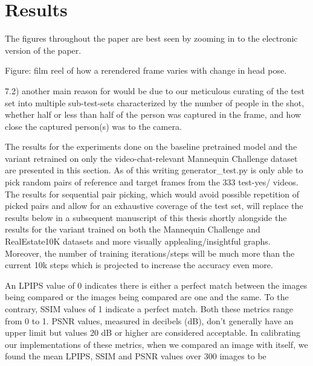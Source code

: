 \section{Results}\label{sec:results} 

The figures throughout the paper are
best seen by zooming in to the electronic version of the paper.

Figure: film reel of how a rerendered frame varies with change in head pose.

7.2) another main reason for would be due to our meticulous curating of the test set into multiple sub-test-sets characterized by the number of people in the shot, whether half or less than half of the person was captured in the frame, and how close the captured person(s) was to the camera.

The results for the experiments done on the baseline pretrained model and the variant retrained on only the video-chat-relevant Mannequin Challenge dataset are presented in this section. As of this writing generator\_test.py is only able to pick random pairs of reference and target frames from the 333 test-yes/ videos. The results for sequential pair picking, which would avoid possible repetition of picked pairs and allow for an exhaustive coverage of the test set, will replace the results below in a subsequent manuscript of this thesis shortly alongside the results for the variant trained on both the Mannequin Challenge and RealEstate10K datasets and more visually applealing/insightful graphs. Moreover, the number of training iterations/steps will be much more than the current 10k steps which is projected to increase the accuracy even more. 

An LPIPS value of 0 indicates there is either a perfect match between the images being compared or the images being compared are one and the same. To the contrary, SSIM values of 1 indicate a perfect match. Both these metrics range from 0 to 1. PSNR values, measured in decibels (dB), don't generally have an upper limit but values 20 dB or higher are considered acceptable. In calibrating our implementations of these metrics, when we compared an image with itself, we found the mean LPIPS, SSIM and PSNR values over 300 images to be  



